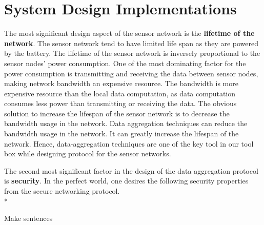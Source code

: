 	\section{System Design Implementations}

	The most significant design aspect of the sensor network is the \textbf{lifetime of the network}.
	The sensor network tend to have limited life span as they are powered by the battery.
	The lifetime of the sensor network is inversely proportional to the sensor nodes' power consumption.
	One of the most dominating factor for the power consumption is transmitting and receiving the data between sensor nodes, making network bandwidth an expensive resource.
	The bandwidth is more expensive resource than the local data computation, as data computation consumes less power than transmitting or receiving the data.
	The obvious solution to increase the lifespan of the sensor network is to decrease the bandwidth usage in the network.  	
	Data aggregation techniques can reduce the bandwidth usage in the network. 
	It can greatly increase the lifespan of the network.
	Hence, data-aggregation techniques are one of the key tool in our tool box while designing protocol for the sensor networks.

	The second most significant factor in the design of the data aggregation protocol is \textbf{security}. 
	In the perfect world, one desires the following security properties from the secure networking protocol.\\*
	
	Make sentences

